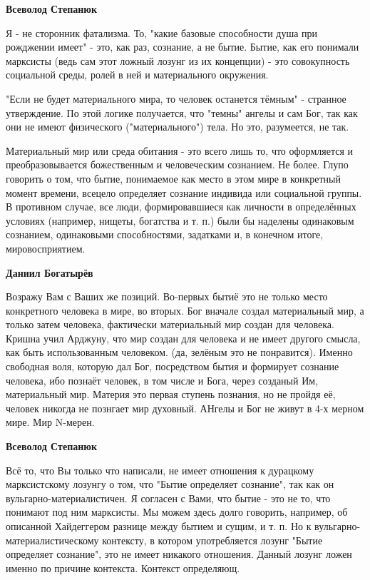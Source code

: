 \begin{itemize}
\begin{itemize}
\textbf{Всеволод Степанюк} 

Я - не сторонник фатализма. То, "какие базовые способности душа при рожджении
имеет" - это, как раз, сознание, а не бытие. Бытие, как его понимали марксисты
(ведь сам этот ложный лозунг из их концепции) - это совокупность социальной
среды, ролей в ней и материального окружения.

"Если не будет материального мира, то человек останется тёмным" - странное
утверждение. По этой логике получается, что "темны" ангелы и сам Бог, так как
они не имеют физического ("материального") тела. Но это, разумеется, не так.

Материальный мир или среда обитания - это всего лишь то, что оформляется и
преобразовывается божественным и человеческим сознанием. Не более. Глупо
говорить о том, что бытие, понимаемое как место в этом мире в конкретный момент
времени, всецело определяет сознание индивида или социальной группы. В
противном случае, все люди, формировавшиеся как личности в определённых
условиях (например, нищеты, богатства и т. п.) были бы наделены одинаковым
сознанием, одинаковыми способностями, задатками и, в конечном итоге,
мировосприятием.

\textbf{Даниил Богатырёв} 

Возражу Вам с Ваших же позиций. Во-первых бытиё это не только место конкретного
человека в мире, во вторых. Бог вначале создал материальный мир, а только затем
человека, фактически материальный мир создан для человека. Кришна учил Арджуну,
что мир создан для человека и не имеет другого смысла, как быть использованным
человеком. (да, зелёным это не понравится). Именно свободная воля, которую дал
Бог, посредством бытия и формирует сознание человека, ибо познаёт человек, в
том числе и Бога, через созданый Им, материальный мир. Материя это первая
ступень познания, но не пройдя её, человек никогда не познгает мир духовный.
АНгелы и Бог не живут в 4-х мерном мире. Мир N-мерен.

\textbf{Всеволод Степанюк} 

Всё то, что Вы только что написали, не имеет отношения к дурацкому
марксистскому лозунгу о том, что "Бытие определяет сознание", так как он
вульгарно-материалистичен. Я согласен с Вами, что бытие - это не то, что
понимают под ним марксисты. Мы можем здесь долго говорить, например, об
описанной Хайдеггером разнице между бытием и сущим, и т. п. Но к
вульгарно-материалистическому контексту, в котором употребляется лозунг "Бытие
определяет сознание", это не имеет никакого отношения. Данный лозунг ложен
именно по причине контекста. Контекст определяющ.


\end{itemize}
\end{itemize}
